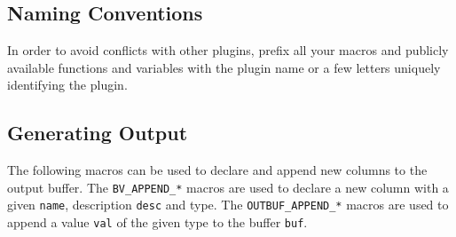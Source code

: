 \documentclass[documentation]{subfiles}
\begin{document}
\subsection{Naming Conventions}

In order to avoid conflicts with other plugins, prefix all your macros and publicly available functions and variables with the plugin name or a few letters uniquely identifying the plugin.

\subsection{Generating Output}\label{section:output}

The following macros can be used to declare and append new columns to the output buffer.
The {\tt BV\_APPEND\_*} macros are used to declare a new column with a given {\tt name}, description {\tt desc} and type.
The {\tt OUTBUF\_APPEND\_*} macros are used to append a value {\tt val} of the given type to the buffer {\tt buf}.
\end{document}
